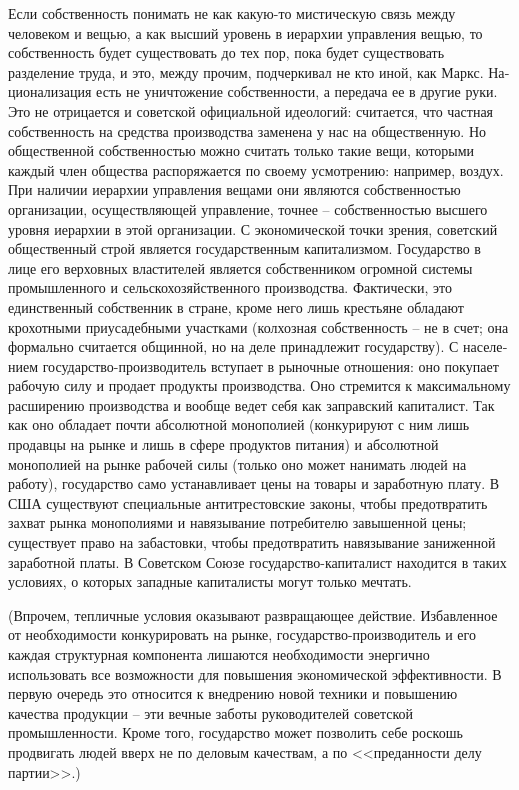 \documentclass{book}
\begin{document}
Если собственность понимать не как какую-то мистическую связь между человеком и вещью, а как высший уровень в ие­рархии управления вещью, то собственность будет существо­вать до тех пор, пока будет существовать разделение труда, и это, между прочим, подчеркивал не кто иной, как Маркс. На­ционализация есть не уничтожение собственности, а передача ее в другие руки. Это не отрицается и советской официальной идеологий: считается, что частная собственность  на средства производства заменена у нас на общественную.  Но общественной собственностью можно считать только такие вещи, кото­рыми каждый член общества распоряжается по своему усмот­рению: например, воздух. При наличии иерархии управления вещами они являются собственностью организации, осущест­вляющей управление, точнее -- собственностью высшего уров­ня иерархии в этой организации. С экономической точки зре­ния, советский общественный строй является государственным капитализмом. Государство в лице его верховных властите­лей является собственником огромной 
системы промышлен­ного и сельскохозяйственного производства. Фактически, это единственный собственник в стране, кроме него лишь кре­стьяне обладают крохотными приусадебными участками (кол­хозная собственность -- не в счет; она формально считается общинной, но на деле принадлежит государству). С населе­нием государство-производитель вступает в рыночные отно­шения: оно покупает рабочую силу и продает продукты произ­водства. Оно стремится к максимальному расширению произ­водства и вообще ведет себя как заправский капиталист. Так как оно обладает почти абсолютной монополией (конкурируют с ним лишь продавцы на рынке и лишь в сфере продуктов пи­тания) и абсолютной монополией на рынке рабочей силы (толь­ко оно может нанимать людей на работу), государство само устанавливает цены на товары и заработную плату. В США су­ществуют специальные антитрестовские законы, чтобы предот­вратить захват рынка монополиями и навязывание потребите­лю завышенной цены; существует право на забастовки, чтобы предотвратить навязывание 
заниженной заработной платы. В Советском Союзе государство-капиталист находится в таких условиях, о которых западные капиталисты могут только мечтать.

(Впрочем, тепличные условия оказывают развращающее действие. Избавленное от необходимости конкурировать на рынке, государство-производитель и его каждая структурная компонента лишаются необходимости энергично использовать все возможности для повышения экономической эффективности. В первую очередь это относится к внедрению новой техники и повышению качества продукции -- эти вечные заботы руководителей советской промышленности. Кроме того, государство может позволить себе роскошь продвигать людей вверх не по деловым качествам, а по <<преданности делу партии>>.)
\end{document}

